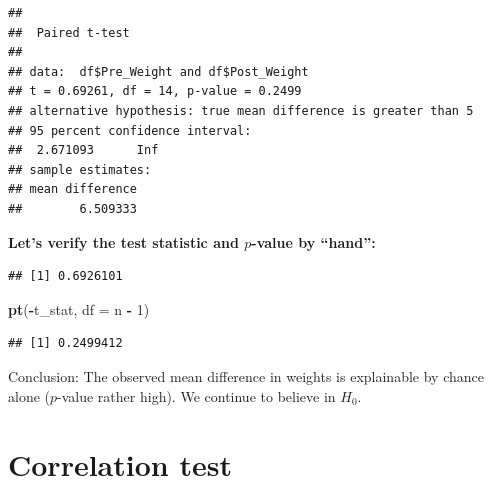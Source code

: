 \documentclass[
]{book}
\newenvironment{Shaded}{\begin{snugshade}}{\end{snugshade}}
\newcommand{\AttributeTok}[1]{\textcolor[rgb]{0.13,0.29,0.53}{#1}}
\newcommand{\DecValTok}[1]{\textcolor[rgb]{0.00,0.00,0.81}{#1}}
\newcommand{\FunctionTok}[1]{\textcolor[rgb]{0.13,0.29,0.53}{\textbf{#1}}}
\newcommand{\NormalTok}[1]{#1}
\newcommand{\OtherTok}[1]{\textcolor[rgb]{0.56,0.35,0.01}{#1}}
\newcommand{\SpecialCharTok}[1]{\textcolor[rgb]{0.81,0.36,0.00}{\textbf{#1}}}
\begin{document}
\begin{verbatim}
## 
##  Paired t-test
## 
## data:  df$Pre_Weight and df$Post_Weight
## t = 0.69261, df = 14, p-value = 0.2499
## alternative hypothesis: true mean difference is greater than 5
## 95 percent confidence interval:
##  2.671093      Inf
## sample estimates:
## mean difference 
##        6.509333
\end{verbatim}

\textbf{Let's verify the test statistic and \(p\)-value by ``hand'':}

\begin{Shaded}
\end{Shaded}

\begin{verbatim}
## [1] 0.6926101
\end{verbatim}

\begin{Shaded}
\begin{Highlighting}[]
\FunctionTok{pt}\NormalTok{(}\SpecialCharTok{{-}}\NormalTok{t\_stat, }\AttributeTok{df =}\NormalTok{ n }\SpecialCharTok{{-}} \DecValTok{1}\NormalTok{)}
\end{Highlighting}
\end{Shaded}

\begin{verbatim}
## [1] 0.2499412
\end{verbatim}

Conclusion: The observed mean difference in weights is explainable by chance alone (\(p\)-value rather high).
We continue to believe in \(H_0\).

\section{Correlation test}\label{correlation-test}
\end{document}
